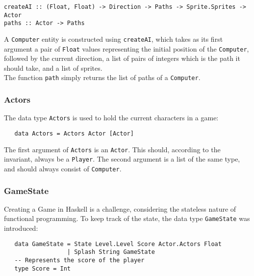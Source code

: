 \documentclass{article}
\begin{document}
   \begin{verbatim}
createAI :: (Float, Float) -> Direction -> Paths -> Sprite.Sprites -> Actor
paths :: Actor -> Paths
   \end{verbatim}

    	\noindent A \texttt{Computer} entity is constructed using \texttt{createAI}, which takes as its first argument a pair of \texttt{Float} values representing the initial position of the \texttt{Computer}, followed by the current direction, a list of pairs of integers which is the path it should take, and a list of sprites. \\
    	\newline
        The function \texttt{path} simply returns the list of paths of a \texttt{Computer}.
    	\subsubsection{Actors}
    	The data type \texttt{Actors} is used to hold the current characters in a game: \\

   \begin{verbatim}
   data Actors = Actors Actor [Actor]
   \end{verbatim}

   		\noindent The first argument of \texttt{Actors} is an \texttt{Actor}. This should, according to the invariant, always be a \texttt{Player}. The second argument is a list of the same type, and should always consist of \texttt{Computer}.

    	\subsubsection{GameState}
    Creating a Game in Haskell is a challenge, considering the stateless nature of functional programming. To keep track of the state, the data type \texttt{GameState} was introduced: \\

   \begin{verbatim}
   data GameState = State Level.Level Score Actor.Actors Float
                  | Splash String GameState
   -- Represents the score of the player
   type Score = Int
   \end{verbatim}
\end{document}
